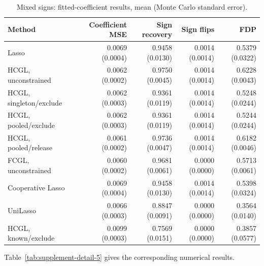\documentclass[11pt,a4paper]{article}
\begin{document}
\begin{table}[htbp]\centering\small\setlength{\tabcolsep}{4pt}
\caption{Mixed signs: fitted-coefficient results, mean (Monte Carlo standard error).}
\begin{tabular}{lrrrr}\toprule
Method & Coefficient MSE & Sign recovery & Sign flips & FDP\\\midrule
Lasso & 0.0069 (0.0004) & 0.9458 (0.0130) & 0.0014 (0.0014) & 0.5379 (0.0322) \\
HCGL, unconstrained & 0.0062 (0.0002) & 0.9750 (0.0045) & 0.0014 (0.0014) & 0.6228 (0.0043) \\
HCGL, singleton/exclude & 0.0062 (0.0003) & 0.9361 (0.0119) & 0.0014 (0.0014) & 0.5248 (0.0244) \\
HCGL, pooled/exclude & 0.0062 (0.0003) & 0.9361 (0.0119) & 0.0014 (0.0014) & 0.5244 (0.0244) \\
HCGL, pooled/release & 0.0061 (0.0002) & 0.9736 (0.0047) & 0.0014 (0.0014) & 0.6182 (0.0046) \\
FCGL, unconstrained & 0.0060 (0.0002) & 0.9681 (0.0061) & 0.0000 (0.0000) & 0.5713 (0.0061) \\
Cooperative Lasso & 0.0069 (0.0004) & 0.9458 (0.0130) & 0.0014 (0.0014) & 0.5398 (0.0324) \\
UniLasso & 0.0066 (0.0003) & 0.8847 (0.0091) & 0.0000 (0.0000) & 0.3564 (0.0140) \\
HCGL, known/exclude & 0.0099 (0.0003) & 0.7569 (0.0151) & 0.0000 (0.0000) & 0.3857 (0.0577) \\
\bottomrule\end{tabular}
\label{tab:supplement-detail-4}
\end{table}

\noindent Table~\ref{tab:supplement-detail-5} gives the corresponding numerical results.
\end{document}
